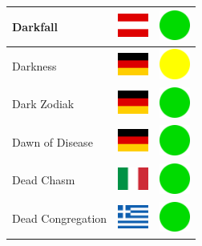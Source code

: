 \documentclass[12pt, a4paper, twoside]{report}
\begin{document}
\begin{center}
\begin{longtable}{|p{5cm}|p{2cm}|p{2cm}|}
 Darkfall                                                   & \includegraphics[width=1cm]{../img/flags/at} &   \includegraphics[width=1cm]{../likes/y} \\ \hline
 Darkness                                                   & \includegraphics[width=1cm]{../img/flags/de} &   \includegraphics[width=1cm]{../likes/m} \\ \hline
 Dark Zodiak                                                & \includegraphics[width=1cm]{../img/flags/de} &   \includegraphics[width=1cm]{../likes/y} \\ \hline
 Dawn of Disease                                            & \includegraphics[width=1cm]{../img/flags/de} &   \includegraphics[width=1cm]{../likes/y} \\ \hline
 Dead Chasm                                                 & \includegraphics[width=1cm]{../img/flags/it} &   \includegraphics[width=1cm]{../likes/y} \\ \hline
 Dead Congregation                                          & \includegraphics[width=1cm]{../img/flags/gr} &   \includegraphics[width=1cm]{../likes/y} \\ \hline

\end{longtable}
\end{center}
\end{document}

